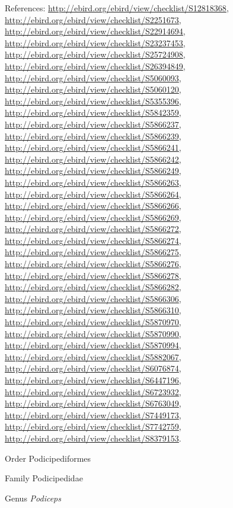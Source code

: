 \documentclass[9pt, article]{memoir}
\begin{document}
\begin{multicols}{2}
References: 
\url{http://ebird.org/ebird/view/checklist/S12818368}, 
\url{http://ebird.org/ebird/view/checklist/S2251673}, 
\url{http://ebird.org/ebird/view/checklist/S22914694}, 
\url{http://ebird.org/ebird/view/checklist/S23237453}, 
\url{http://ebird.org/ebird/view/checklist/S25724908}, 
\url{http://ebird.org/ebird/view/checklist/S26394849}, 
\url{http://ebird.org/ebird/view/checklist/S5060093}, 
\url{http://ebird.org/ebird/view/checklist/S5060120}, 
\url{http://ebird.org/ebird/view/checklist/S5355396}, 
\url{http://ebird.org/ebird/view/checklist/S5842359}, 
\url{http://ebird.org/ebird/view/checklist/S5866237}, 
\url{http://ebird.org/ebird/view/checklist/S5866239}, 
\url{http://ebird.org/ebird/view/checklist/S5866241}, 
\url{http://ebird.org/ebird/view/checklist/S5866242}, 
\url{http://ebird.org/ebird/view/checklist/S5866249}, 
\url{http://ebird.org/ebird/view/checklist/S5866263}, 
\url{http://ebird.org/ebird/view/checklist/S5866264}, 
\url{http://ebird.org/ebird/view/checklist/S5866266}, 
\url{http://ebird.org/ebird/view/checklist/S5866269}, 
\url{http://ebird.org/ebird/view/checklist/S5866272}, 
\url{http://ebird.org/ebird/view/checklist/S5866274}, 
\url{http://ebird.org/ebird/view/checklist/S5866275}, 
\url{http://ebird.org/ebird/view/checklist/S5866276}, 
\url{http://ebird.org/ebird/view/checklist/S5866278}, 
\url{http://ebird.org/ebird/view/checklist/S5866282}, 
\url{http://ebird.org/ebird/view/checklist/S5866306}, 
\url{http://ebird.org/ebird/view/checklist/S5866310}, 
\url{http://ebird.org/ebird/view/checklist/S5870970}, 
\url{http://ebird.org/ebird/view/checklist/S5870990}, 
\url{http://ebird.org/ebird/view/checklist/S5870994}, 
\url{http://ebird.org/ebird/view/checklist/S5882067}, 
\url{http://ebird.org/ebird/view/checklist/S6076874}, 
\url{http://ebird.org/ebird/view/checklist/S6447196}, 
\url{http://ebird.org/ebird/view/checklist/S6723932}, 
\url{http://ebird.org/ebird/view/checklist/S6763049}, 
\url{http://ebird.org/ebird/view/checklist/S7449173}, 
\url{http://ebird.org/ebird/view/checklist/S7742759}, 
\url{http://ebird.org/ebird/view/checklist/S8379153}.

\vspace{6pt}\noindent\hspace{18pt}Order Podicipediformes


\vspace{6pt}\noindent\hspace{24pt}Family Podicipedidae


\vspace{6pt}\noindent\hspace{30pt}Genus \textit{Podiceps}



\end{multicols}
\end{document}
